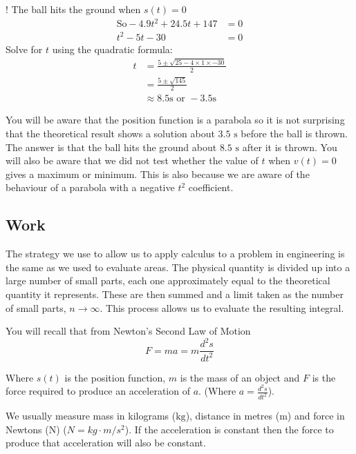 \begin{tasks}
\task! The ball hits the ground when $s (t) =0$
\begin{align*}\text{So} -4.9 t^{2} +24.5 t +147 &  = 0 \\
t^{2} -5 t -30 &  = 0\end{align*}
Solve for $t$ using the quadratic formula: 
\begin{align*}t &  = \frac{5 \pm \sqrt{25 -4 \times 1 \times  -30}}{2} \\
 &  = \frac{5 \pm \sqrt{145}}{2} \\
 &  \approx 8.5\text{}\mbox{s}\text{ or } -3.5\text{}\mbox{s}\end{align*}\end{tasks}
You will be aware that the position function is a parabola so it is not surprising that the theoretical result shows a solution about $3.5 \mbox{ s}$ before the ball is thrown. The
answer is that the ball hits the ground about $8.5 \mbox{ s}$ after it is thrown. You will also be aware that we did not test whether the value of $t$ when $v (t) =0$ gives a maximum or minimum. This is also because we are aware of the behaviour of a parabola with a negative $t^{2}$ coefficient. 

\subsection*{Work}
The strategy we use to allow us to apply calculus to a problem in engineering is the same as we used to evaluate areas. The
physical quantity is divided up into a large number of small parts, each one approximately equal to the theoretical quantity it represents. These
are then summed and a limit taken as the number of small parts, $n \rightarrow \infty $. This process allows us to evaluate the resulting integral. 

You
will recall that from Newton's Second Law of Motion
\begin{equation}F =m a =m \frac{d^{2} s}{d t^{2}}\tag{1}
\end{equation}

Where $s (t)$ is the position function, $m$ is the mass of an object and $F$ is the force required to produce an acceleration of $a$. (Where $a =\frac{d^{2} s}{d t^{2}}$). 

We usually measure mass in kilograms ($\mbox{kg}$), distance in metres ($\mbox{m}$) and force in Newtons ($\mbox{N}$) \linebreak\relax ($N =k g \cdot m/s^{2}$). If the acceleration is constant then the force to produce that acceleration will also
be constant. 

